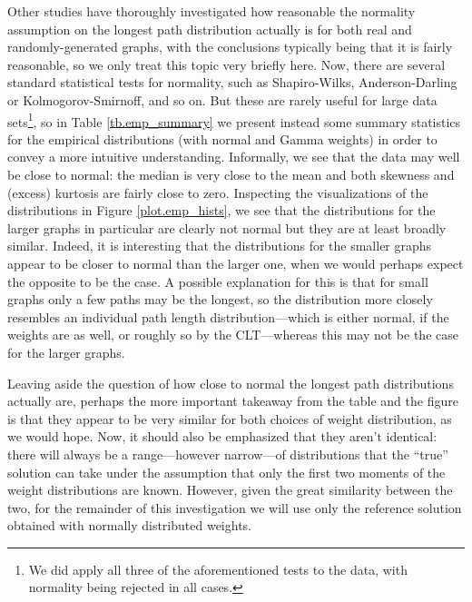 \documentclass[12pt]{article}
\begin{document}
      Other studies have thoroughly investigated how reasonable the normality assumption on the longest path distribution actually is for both real and randomly-generated graphs, with the conclusions typically being that it is fairly reasonable, so we only treat this topic very briefly here. Now, there are several standard statistical tests for normality, such as Shapiro-Wilks, Anderson-Darling or Kolmogorov-Smirnoff, and so on. But these are rarely useful for large data sets\footnote{We did apply all three of the aforementioned tests to the data, with normality being rejected in all cases.}, so in Table \ref{tb.emp_summary} we present instead some summary statistics for the empirical distributions (with normal and Gamma weights) in order to convey a more intuitive understanding. Informally, we see that the data may well be close to normal: the median is very close to the mean and both skewness and (excess) kurtosis are fairly close to zero. Inspecting the visualizations of the distributions in Figure \ref{plot.emp_hists}, we see that the distributions for the larger graphs in particular are clearly not normal but they are at least broadly similar. Indeed, it is interesting that the distributions for the smaller graphs appear to be closer to normal than the larger one, when we would perhaps expect the opposite to be the case. A possible explanation for this is that for small graphs only a few paths may be the longest, so the distribution more closely resembles an individual path length distribution---which is either normal, if the weights are as well, or roughly so by the CLT---whereas this may not be the case for the larger graphs.    

      Leaving aside the question of how close to normal the longest path distributions actually are, perhaps the more important takeaway from the table and the figure is that they appear to be very similar for both choices of weight distribution, as we would hope. Now, it should also be emphasized that they aren't identical: there will always be a range---however narrow---of distributions that the ``true'' solution can take under the assumption that only the first two moments of the weight distributions are known. However, given the great similarity between the two, for the remainder of this investigation we will use only the reference solution obtained with normally distributed weights. 
\end{document}
